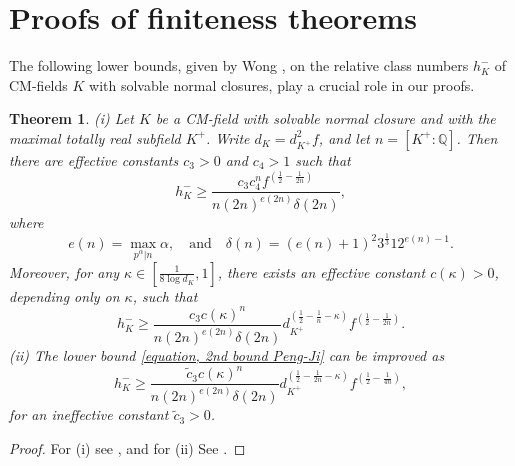\documentclass[12pt]{amsart}
\newtheorem{theorem}{Theorem}[section]
\theoremstyle{definition}
\numberwithin{equation}{section}
\begin{document}
\section{Proofs of finiteness theorems}\label{three}
The following lower bounds,  given by Wong \cite{Peng-Jie}, on the relative class numbers $h_K^-$ of CM-fields $K$ with solvable normal closures,  play a crucial role in our proofs.
\begin{theorem}\label{theorem,Peng-Jie}
(i) Let $K$ be a CM-field with solvable normal closure and with the maximal totally real subfield $K^+$. Write $d_K=d_{K^+}^2 f$, and let $n=[K^+:\mathbb{Q}]$. Then there are effective constants $c_3 >0$ and $c_4 >1$ such that
\begin{equation} \label{equation, 1st bound Peng-Ji}
h_K^- \geq \frac{c_3 c_4^n f^{\left(\frac{1}{2}-\frac{1}{2n} \right)}}{n (2n)^{e(2n)} \delta (2n)} ,
\end{equation}
where
\begin{equation}
\label{delta(n)}
e(n)=\max_{p^{\alpha} | n} \alpha, \quad \text{and} \quad 	
\delta (n)=\left(e(n)+1 \right)^2 3^{\frac{1}{3}} 12^{e(n)-1}.
\end{equation}
Moreover, for any $\kappa \in \left[\frac{1}{8 \log {d_K}}, 1\right]$, there exists an effective constant $c(\kappa) >0$, depending only on $\kappa$, such that
\begin{equation} \label{equation, 2nd bound Peng-Ji}
	h_K^- \geq \frac{c_3 c(\kappa)^n}{n (2n)^{e(2n)} \delta (2n)} d_{K^+}^{(\frac{1}{2}-\frac{1}{n}-\kappa)} f^{(\frac{1}{2}-\frac{1}{2n})}.
\end{equation}
(ii) The lower bound \eqref{equation, 2nd bound Peng-Ji} can be improved as
\begin{equation} \label{equation, 3rd bound Peng-Ji}
	h_K^- \geq \frac{\tilde{c}_3 c(\kappa)^n}{n (2n)^{e(2n)} \delta (2n)} d_{K^+}^{(\frac{1}{2}-\frac{1}{2n}-\kappa)} f^{(\frac{1}{2}-\frac{1}{4n})},
\end{equation}
for an ineffective constant $\tilde{c}_3 >0$.
\end{theorem}
\begin{proof}
For (i) see \cite[Theorem 3.1]{Peng-Jie}, and for  (ii) See   \cite[Proof of Theorem 1.2]{Peng-Jie}.
\end{proof}
\end{document}
